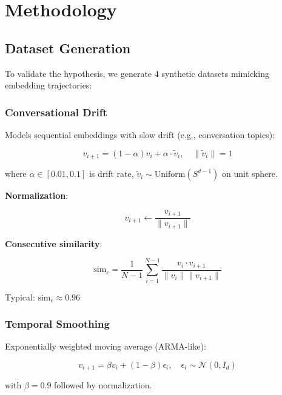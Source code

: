\documentclass[11pt,a4paper]{article}
\begin{document}
\section{Methodology}

\subsection{Dataset Generation}

To validate the hypothesis, we generate 4 synthetic datasets mimicking embedding trajectories:

\subsubsection{Conversational Drift}

Models sequential embeddings with slow drift (e.g., conversation topics):

\begin{equation}
v_{i+1} = (1 - \alpha) v_i + \alpha \cdot \tilde{v}_i, \quad \|\tilde{v}_i\| = 1
\end{equation}

where $\alpha \in [0.01, 0.1]$ is drift rate, $\tilde{v}_i \sim \text{Uniform}(S^{d-1})$ on unit sphere.

\textbf{Normalization}:

\begin{equation}
v_{i+1} \leftarrow \frac{v_{i+1}}{\|v_{i+1}\|}
\end{equation}

\textbf{Consecutive similarity}:

\begin{equation}
\text{sim}_c = \frac{1}{N-1} \sum_{i=1}^{N-1} \frac{v_i \cdot v_{i+1}}{\|v_i\| \|v_{i+1}\|}
\end{equation}

Typical: $\text{sim}_c \approx 0.96$

\subsubsection{Temporal Smoothing}

Exponentially weighted moving average (ARMA-like):

\begin{equation}
v_{i+1} = \beta v_i + (1-\beta) \epsilon_i, \quad \epsilon_i \sim \mathcal{N}(0, I_d)
\end{equation}

with $\beta = 0.9$ followed by normalization.
\end{document}
